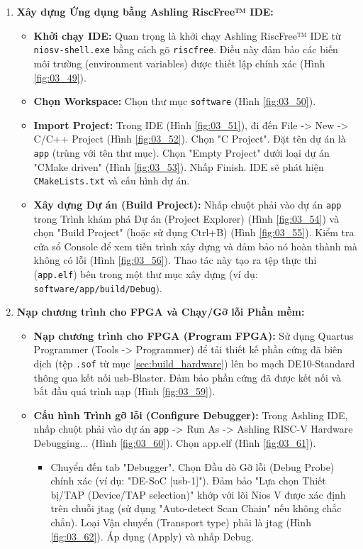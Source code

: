 \begin{enumerate}
\begin{itemize}
    \end{itemize}
    \item \textbf{Xây dựng Ứng dụng bằng Ashling RiscFree™ IDE:}
    \begin{itemize}
        \item \textbf{Khởi chạy IDE:} Quan trọng là khởi chạy Ashling RiscFree™ IDE từ \texttt{ niosv-shell.exe} bằng cách gõ \texttt{riscfree}. Điều này đảm bảo các biến môi trường (environment variables) được thiết lập chính xác (Hình \ref{fig:03_49}).
        \item \textbf{Chọn Workspace:} Chọn thư mục \texttt{software} (Hình \ref{fig:03_50}).
        \item \textbf{Import Project:} Trong IDE (Hình \ref{fig:03_51}), đi đến File -> New -> C/C++ Project (Hình \ref{fig:03_52}). Chọn "C Project". Đặt tên dự án là \texttt{app} (trùng với tên thư mục). Chọn "Empty Project" dưới loại dự án "CMake driven" (Hình \ref{fig:03_53}). Nhấp Finish. IDE sẽ phát hiện \texttt{CMakeLists.txt} và cấu hình dự án.
        \item \textbf{Xây dựng Dự án (Build Project):} Nhấp chuột phải vào dự án \texttt{app} trong Trình khám phá Dự án (Project Explorer) (Hình \ref{fig:03_54}) và chọn "Build Project" (hoặc sử dụng Ctrl+B) (Hình \ref{fig:03_55}). Kiểm tra cửa sổ Console để xem tiến trình xây dựng và đảm bảo nó hoàn thành mà không có lỗi (Hình \ref{fig:03_56}). Thao tác này tạo ra tệp thực thi (\texttt{app.elf}) bên trong một thư mục xây dựng (ví dụ: \texttt{software/app/build/Debug}). 
    \end{itemize}
    \item \textbf{Nạp chương trình cho FPGA và Chạy/Gỡ lỗi Phần mềm:}
    \begin{itemize}
        \item \textbf{Nạp chương trình cho FPGA (Program FPGA):} Sử dụng Quartus Programmer (Tools -> Programmer) để tải thiết kế phần cứng đã biên dịch (tệp \texttt{.sof} từ mục \ref{sec:build_hardware}) lên bo mạch DE10-Standard thông qua kết nối \acrshort{usb}-Blaster. Đảm bảo phần cứng đã được kết nối và bắt đầu quá trình nạp (Hình \ref{fig:03_59}).
        \item \textbf{Cấu hình Trình gỡ lỗi (Configure Debugger):} Trong Ashling IDE, nhấp chuột phải vào dự án \texttt{app} -> Run As -> Ashling RISC-V Hardware Debugging... (Hình \ref{fig:03_60}). Chọn app.elf (Hình \ref{fig:03_61}).
        \begin{itemize}
            \item Chuyển đến tab "Debugger". Chọn Đầu dò Gỡ lỗi (Debug Probe) chính xác (ví dụ: "DE-SoC [\acrshort{usb}-1]"). Đảm bảo "Lựa chọn Thiết bị/TAP (Device/TAP selection)" khớp với lõi Nios V được xác định trên chuỗi \acrshort{jtag} (sử dụng "Auto-detect Scan Chain" nếu không chắc chắn). Loại Vận chuyển (Transport type) phải là \acrshort{jtag} (Hình \ref{fig:03_62}). Áp dụng (Apply) và nhấp Debug.

\end{itemize}
\end{itemize}
\end{enumerate}
